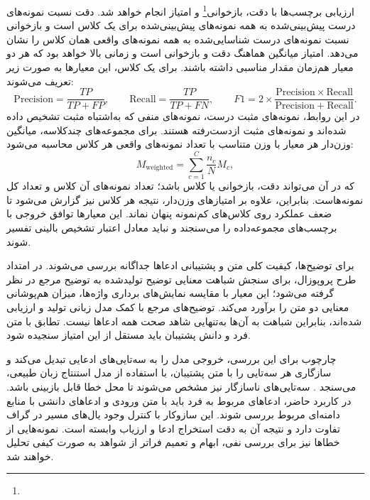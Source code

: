 ارزیابی برچسب‌ها با دقت، بازخوانی\footnote{} و امتیاز  انجام خواهد شد. دقت نسبت نمونه‌های درست پیش‌بینی‌شده به همه نمونه‌های پیش‌بینی‌شده برای یک کلاس است و بازخوانی نسبت نمونه‌های درست شناسایی‌شده به همه نمونه‌های واقعی همان کلاس را نشان می‌دهد. امتیاز  میانگین هماهنگ دقت و بازخوانی است و زمانی بالا خواهد بود که هر دو معیار هم‌زمان مقدار مناسبی داشته باشند. برای یک کلاس، این معیارها به صورت زیر تعریف می‌شوند:
\begin{equation}
\mathrm{Precision}=\frac{TP}{TP+FP},\qquad
\mathrm{Recall}=\frac{TP}{TP+FN},\qquad
F1=2\times\frac{\mathrm{Precision}\times\mathrm{Recall}}
{\mathrm{Precision}+\mathrm{Recall}}.
\end{equation}
در این روابط،  نمونه‌های مثبت درست،  نمونه‌های منفی که به‌اشتباه مثبت تشخیص داده شده‌اند و  نمونه‌های مثبت ازدست‌رفته هستند. برای مجموعه‌های چندکلاسه، میانگین وزن‌دار هر معیار با وزن متناسب با تعداد نمونه‌های واقعی هر کلاس محاسبه می‌شود:
\begin{equation}
M_{\mathrm{weighted}}=\sum_{c=1}^{C}\frac{n_c}{N}M_c,
\end{equation}
که در آن  می‌تواند دقت، بازخوانی یا  کلاس  باشد؛  تعداد نمونه‌های آن کلاس و  تعداد کل نمونه‌هاست. بنابراین، علاوه بر امتیازهای وزن‌دار، نتیجه هر کلاس نیز گزارش می‌شود تا ضعف عملکرد روی کلاس‌های کم‌نمونه پنهان نماند. این معیارها توافق خروجی با برچسب‌های مجموعه‌داده را می‌سنجند و نباید معادل اعتبار تشخیص بالینی تفسیر شوند.

برای توضیح‌ها، کیفیت کلی متن و پشتیبانی ادعاها جداگانه بررسی می‌شوند. در امتداد طرح پروپوزال،  برای سنجش شباهت معنایی توضیح تولیدشده به توضیح مرجع در نظر گرفته می‌شود؛ این معیار با مقایسه نمایش‌های برداری واژه‌ها، میزان هم‌پوشانی معنایی دو متن را برآورد می‌کند. توضیح‌های مرجع  با کمک مدل زبانی تولید و ارزیابی شده‌اند، بنابراین شباهت به آن‌ها به‌تنهایی شاهد صحت همه ادعاها نیست. تطابق با متن فرد و دانش پشتیبان باید مستقل از این امتیاز سنجیده شود.

چارچوب  برای این بررسی، خروجی مدل را به سه‌تایی‌های ادعایی تبدیل می‌کند و سازگاری هر سه‌تایی را با متن پشتیبان، با استفاده از مدل استنتاج زبان طبیعی، می‌سنجد \cite{sansford2024grapheval}. سه‌تایی‌های ناسازگار نیز مشخص می‌شوند تا محل خطا قابل بازبینی باشد. در کاربرد حاضر، ادعاهای مربوط به فرد باید با متن ورودی و ادعاهای دانشی با منابع دامنه‌ای مربوط بررسی شوند. این سازوکار با کنترل وجود یال‌های مسیر در گراف تفاوت دارد و نتیجه آن به دقت استخراج ادعا و ارزیاب وابسته است. نمونه‌هایی از خطاها نیز برای بررسی نفی، ابهام و تعمیم فراتر از شواهد به صورت کیفی تحلیل خواهند شد.

